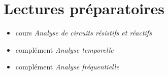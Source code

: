 \documentclass[canadien,12pt,oneside,letterpaper]{article}
\begin{document}
\vspace{-2ex}
\section{Lectures préparatoires}\label{sec:lectures}

\begin{itemize}
\item cours \textit{Analyse de circuits résistifs et réactifs}
\item complément \textit{Analyse temporelle}
\item complément \textit{Analyse fréquentielle}
\end{itemize}




\vspace{-2ex}
\end{document}
